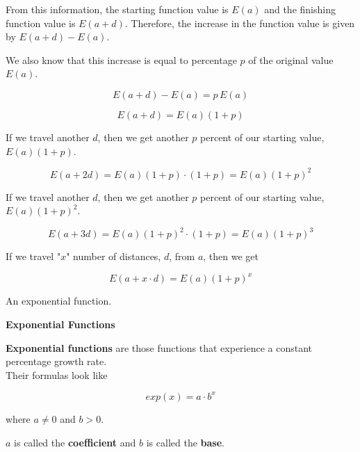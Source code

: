 \documentclass{ximera}
\begin{document}
From this information, the starting function value is $E(a)$ and the finishing function value is $E(a+d)$.  Therefore, the increase in the function value is given by $E(a+d) - E(a)$.

We also know that this increase is equal to percentage $p$ of the original value $E(a)$.



\[
E(a+d) - E(a) = p \, E(a)
\]

\[
E(a+d) = E(a) (1+p)
\]

If we travel another $d$, then we get another $p$ percent of our starting value, $E(a)(1+p)$.


\[
E(a + 2d) = E(a)(1+p) \cdot (1+p) = E(a) (1+p)^2
\]


If we travel another $d$, then we get another $p$ percent of our starting value, $E(a)(1+p)^2$.


\[
E(a + 3d) = E(a)(1+p)^2 \cdot (1+p) = E(a) (1+p)^3
\]



If we travel "$x$" number of distances, $d$, from $a$, then we get

\[
E(a + x \cdot d) = E(a)(1+p)^x 
\]

An exponential function.



\begin{definition} \textbf{\textcolor{green!50!black}{Exponential Functions}}


\textbf{Exponential functions} are those functions that experience a constant percentage growth rate. \\


Their formulas look like

\[
exp(x) = a \cdot b^x
\]


where $a \ne 0$ and $b > 0$.

$a$ is called the \textbf{coefficient} and $b$ is called the \textbf{base}.

\end{definition}
\end{document}
